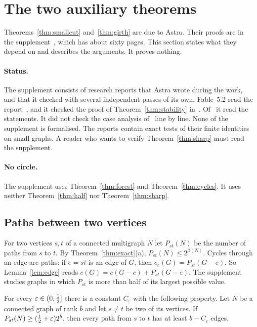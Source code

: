 \section{The two auxiliary theorems}\label{sec:inputs}

Theorems~\ref{thm:smallcut} and~\ref{thm:girth} are due to Astra. Their proofs are in the
supplement~\cite{S1,S2,S3}, which has about sixty pages. This section states what they depend on
and describes the arguments. It proves nothing.

\paragraph{Status.}
The supplement consists of research reports that Astra wrote during the work, and that it checked
with several independent passes of its own. Fable~5.2 read the report~\cite{S2}, and it checked the
proof of Theorem~\ref{thm:stability} in~\cite{S3}. Of~\cite{S1} it read the statements. It did not
check the case analysis of~\cite{S1} line by line. None of the supplement is formalised. The reports contain
exact tests of their finite identities on small graphs. A reader who wants to verify
Theorem~\ref{thm:sharp} must read the supplement.

\paragraph{No circle.}
The supplement uses Theorem~\ref{thm:forest} and Theorem~\ref{thm:cycles}. It uses neither
Theorem~\ref{thm:half} nor Theorem~\ref{thm:sharp}.

\subsection{Paths between two vertices}

For two vertices $s,t$ of a connected multigraph $N$ let $P_{st}(N)$ be the number of paths from
$s$ to $t$. By Theorem~\ref{thm:exact}(a), $P_{st}(N)\le2^{\beta(N)}$. Cycles through an edge are
paths: if $e=st$ is an edge of $G$, then $c_e(G)=P_{st}(G-e)$. So Lemma~\ref{lem:edge} reads
$c(G)=c(G-e)+P_{st}(G-e)$. The supplement studies graphs in which $P_{st}$ is more than half of its
largest possible value.

\begin{theorem}\label{thm:stability}
For every $\varepsilon\in(0,\tfrac12]$ there is a constant $C_\varepsilon$ with the following
property. Let $N$ be a connected graph of rank $b$ and let $s\ne t$ be two of its vertices. If
$P_{st}(N)\ge(\tfrac12+\varepsilon)2^{b}$, then every path from $s$ to $t$ has at least
$b-C_\varepsilon$ edges.
\end{theorem}

